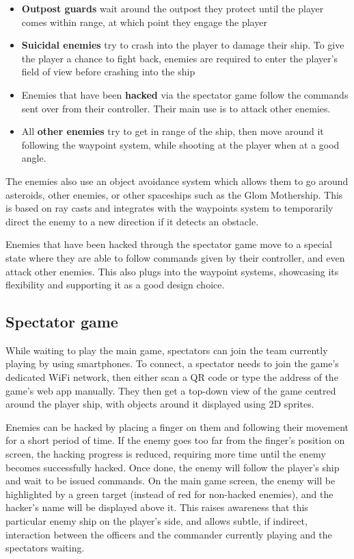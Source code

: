 \documentclass[a4paper,11pt]{article}
\begin{document}
\begin{itemize}[noitemsep,topsep=.5ex]
	\item \textbf{Outpost guards} wait around the outpost they protect until the player comes within range, at which point they engage the player
	\item \textbf{Suicidal enemies} try to crash into the player to damage their ship. To give the player a chance to fight back, enemies are required to enter the player’s field of view before crashing into the ship
	\item Enemies that have been \textbf{hacked} via the spectator game follow the commands sent over from their controller. Their main use is to attack other enemies.
	\item All \textbf{other enemies} try to get in range of the ship, then move around it following the waypoint system, while shooting at the player when at a good angle.
\end{itemize}

The enemies also use an object avoidance system which allows them to go around asteroids, other enemies, or other spaceships such as the Glom Mothership. This is based on ray casts and integrates with the waypoints system to temporarily direct the enemy to a new direction if it detects an obstacle.

Enemies that have been hacked through the spectator game move to a special state where they are able to follow commands given by their controller, and even attack other enemies. This also plugs into the waypoint systems, showcasing its flexibility and supporting it as a good design choice.

\subsection{Spectator game}
While waiting to play the main game, spectators can join the team currently playing by using smartphones. To connect, a spectator needs to join the game’s dedicated WiFi network, then either scan a QR code or type the address of the game’s web app manually. They then get a top-down view of the game centred around the player ship, with objects around it displayed using 2D sprites.

Enemies can be hacked by placing a finger on them and following their movement for a short period of time. If the enemy goes too far from the finger’s position on screen, the hacking progress is reduced, requiring more time until the enemy becomes successfully hacked. Once done, the enemy will follow the player’s ship and wait to be issued commands. On the main game screen, the enemy will be highlighted by a green target (instead of red for non-hacked enemies), and the hacker’s name will be displayed above it. This raises awareness that this particular enemy ship on the player’s side, and allows subtle, if indirect, interaction between the officers and the commander currently playing and the spectators waiting.
\end{document}
